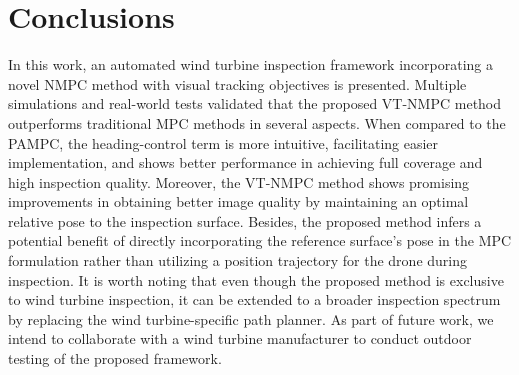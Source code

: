 \documentclass[letterpaper, 10 pt, conference]{ieeeconf}  %
\begin{document}
\section{Conclusions}
\label{sec:conclusion}




In this work, an automated wind turbine inspection framework incorporating a novel NMPC method with visual tracking objectives is presented. Multiple simulations and real-world tests validated that the proposed VT-NMPC method outperforms traditional MPC methods in several aspects. When compared to the PAMPC, the heading-control term is more intuitive, facilitating easier implementation, and shows better performance in achieving full coverage and high inspection quality. Moreover, the VT-NMPC method shows promising improvements in obtaining better image quality by maintaining an optimal relative pose to the inspection surface. Besides, the proposed method infers a potential benefit of directly incorporating the reference surface's pose in the MPC formulation rather than utilizing a position trajectory for the drone during inspection. It is worth noting that even though the proposed method is exclusive to wind turbine inspection, it can be extended to a broader inspection spectrum by replacing the wind turbine-specific path planner.
As part of future work, we intend to collaborate with a wind turbine manufacturer to conduct outdoor testing of the proposed framework.
\end{document}
